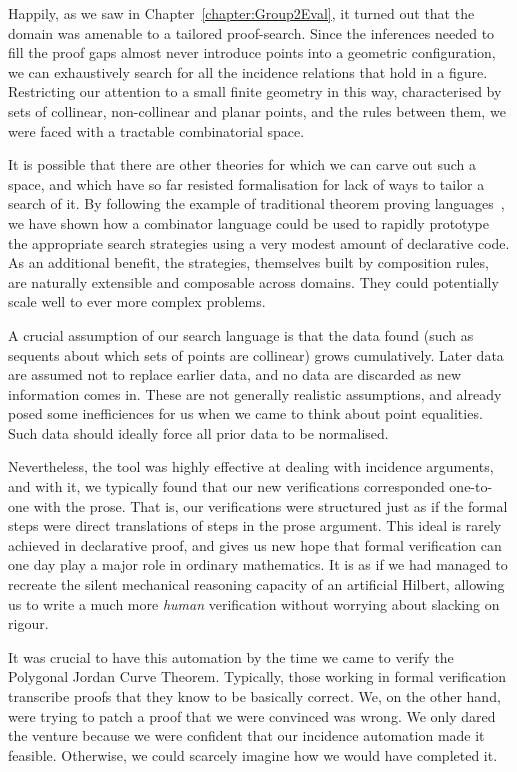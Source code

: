 Happily, as we saw in Chapter~\ref{chapter:Group2Eval}, it turned out that the domain was amenable to a tailored proof-search. Since the inferences needed to fill the proof gaps almost never introduce points into a geometric configuration, we can exhaustively search for all the incidence relations that hold in a figure. Restricting our attention to a small finite geometry in this way, characterised by sets of collinear, non-collinear and planar points, and the rules between them, we were faced with a tractable combinatorial space.

It is possible that there are other theories for which we can carve out such a space, and which have so far resisted formalisation for lack of ways to tailor a search of it. By following the example of traditional theorem proving languages~\cite{Tactics}, we have shown how a combinator language could be used to rapidly prototype the appropriate search strategies using a very modest amount of declarative code. As an additional benefit, the strategies, themselves built by composition rules, are naturally extensible and composable across domains. They could potentially scale well to ever more complex problems.

A crucial assumption of our search language is that the data found (such as sequents about which sets of points are collinear) grows cumulatively. Later data are assumed not to replace earlier data, and no data are discarded as new information comes in. These are not generally realistic assumptions, and already posed some inefficiences for us when we came to think about point equalities. Such data should ideally force all prior data to be normalised.

Nevertheless, the tool was highly effective at dealing with incidence arguments, and with it, we typically found that our new verifications corresponded one-to-one with the prose. That is, our verifications were structured just as if the formal steps were direct translations of steps in the prose argument. This ideal is rarely achieved in declarative proof, and gives us new hope that formal verification can one day play a major role in ordinary mathematics. It is as if we had managed to recreate the silent mechanical reasoning capacity of an artificial Hilbert, allowing us to write a much more \emph{human} verification without worrying about slacking on rigour.

It was crucial to have this automation by the time we came to verify the Polygonal Jordan Curve Theorem. Typically, those working in formal verification transcribe proofs that they know to be basically correct. We, on the other hand, were trying to patch a proof that we were convinced was wrong. We only dared the venture because we were confident that our incidence automation made it feasible. Otherwise, we could scarcely imagine how we would have completed it.

